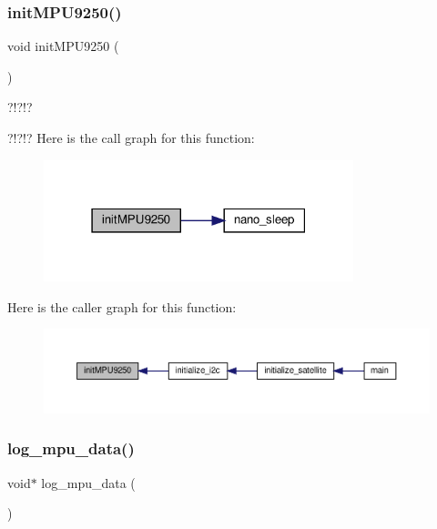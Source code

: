 \subsubsection{\texorpdfstring{init\+M\+P\+U9250()}{initMPU9250()}}
{\footnotesize\ttfamily void init\+M\+P\+U9250 (\begin{DoxyParamCaption}{ }\end{DoxyParamCaption})}

?!?!?

?!?!? Here is the call graph for this function\+:\nopagebreak
\begin{figure}[H]
\begin{center}
\leavevmode
\includegraphics[width=255pt]{i2c-interface_8c_a24e95677ec9c52347c6e2bda7708c319_cgraph}
\end{center}
\end{figure}
Here is the caller graph for this function\+:\nopagebreak
\begin{figure}[H]
\begin{center}
\leavevmode
\includegraphics[width=350pt]{i2c-interface_8c_a24e95677ec9c52347c6e2bda7708c319_icgraph}
\end{center}
\end{figure}
\mbox{\label{i2c-interface_8c_a0ffd56a84248b3976097e0d38b2fcdaf}} 
\subsubsection{\texorpdfstring{log\+\_\+mpu\+\_\+data()}{log\_mpu\_data()}}
{\footnotesize\ttfamily void$\ast$ log\+\_\+mpu\+\_\+data (\begin{DoxyParamCaption}{ }\end{DoxyParamCaption})}

